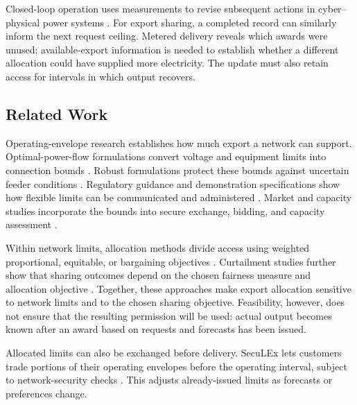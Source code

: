 \documentclass[twoside,twocolumn,9pt]{article}
\begin{document}
Closed-loop operation uses measurements to revise subsequent actions in
cyber--physical power systems \cite{yu2016smartgridcps,xue2017cpsse}.
For export sharing, a completed record can similarly inform the next request
ceiling. Metered delivery reveals which awards were unused; available-export
information is needed to establish whether a different allocation could have
supplied more electricity. The update must also retain access for intervals
in which output recovers.

\subsection{Related Work}

Operating-envelope research establishes how much export a network can support.
Optimal-power-flow formulations convert voltage and equipment limits into connection
bounds \cite{petrou2021dynamiclimits,liu2022opfenvelopes}. Robust formulations
protect these bounds against uncertain feeder conditions
\cite{liu2022robustdoe,liu2023linearopfdoe}. Regulatory guidance and demonstration
specifications show how flexible limits can be communicated and administered
\cite{aer2024exportlimits,arena2024converge,aemo2023edgedataspec}. Market and
capacity studies incorporate the bounds into secure exchange, bidding, and
capacity assessment
\cite{ullah2021physical,pankhurst2024transactive,hoque2024doemarket,
azim2025doetrading,attarha2022networksecure,mahmoodi2024capacity}.

Within network limits, allocation methods divide access using weighted proportional, equitable, or
bargaining objectives
\cite{petrou2020weighted,alam2023allocation,cuenca2022nonbias,
jiang2025bargaining}. Curtailment studies further show that sharing outcomes
depend on the chosen fairness measure and allocation objective
\cite{liu2020fairness,lusis2020reducing,gupta2024analysis,
gupta2024fairness}. Together, these approaches make export allocation sensitive
to network limits and to the chosen sharing objective. Feasibility, however,
does not ensure that the resulting permission will be used: actual output
becomes known after an award based on requests and forecasts has been issued.

Allocated limits can also be exchanged before delivery. SecuLEx lets customers
trade portions of their operating envelopes before the operating interval,
subject to network-security checks \cite{vassallo2027seculex}. This adjusts
already-issued limits as forecasts or preferences change.
\end{document}

